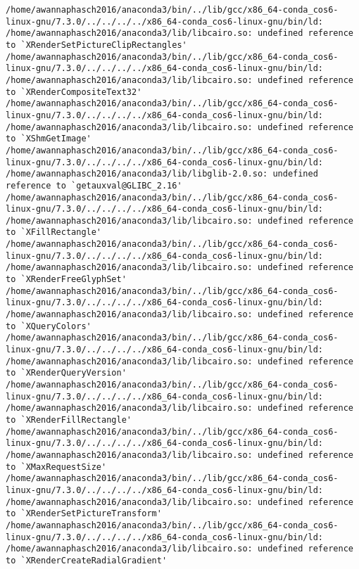 \documentclass[11pt]{article}
\begin{document}
\begin{enumerate}
\begin{enumerate}
\begin{verbatim}
/home/awannaphasch2016/anaconda3/bin/../lib/gcc/x86_64-conda_cos6-linux-gnu/7.3.0/../../../../x86_64-conda_cos6-linux-gnu/bin/ld: /home/awannaphasch2016/anaconda3/lib/libcairo.so: undefined reference to `XRenderSetPictureClipRectangles'
/home/awannaphasch2016/anaconda3/bin/../lib/gcc/x86_64-conda_cos6-linux-gnu/7.3.0/../../../../x86_64-conda_cos6-linux-gnu/bin/ld: /home/awannaphasch2016/anaconda3/lib/libcairo.so: undefined reference to `XRenderCompositeText32'
/home/awannaphasch2016/anaconda3/bin/../lib/gcc/x86_64-conda_cos6-linux-gnu/7.3.0/../../../../x86_64-conda_cos6-linux-gnu/bin/ld: /home/awannaphasch2016/anaconda3/lib/libcairo.so: undefined reference to `XShmGetImage'
/home/awannaphasch2016/anaconda3/bin/../lib/gcc/x86_64-conda_cos6-linux-gnu/7.3.0/../../../../x86_64-conda_cos6-linux-gnu/bin/ld: /home/awannaphasch2016/anaconda3/lib/libglib-2.0.so: undefined reference to `getauxval@GLIBC_2.16'
/home/awannaphasch2016/anaconda3/bin/../lib/gcc/x86_64-conda_cos6-linux-gnu/7.3.0/../../../../x86_64-conda_cos6-linux-gnu/bin/ld: /home/awannaphasch2016/anaconda3/lib/libcairo.so: undefined reference to `XFillRectangle'
/home/awannaphasch2016/anaconda3/bin/../lib/gcc/x86_64-conda_cos6-linux-gnu/7.3.0/../../../../x86_64-conda_cos6-linux-gnu/bin/ld: /home/awannaphasch2016/anaconda3/lib/libcairo.so: undefined reference to `XRenderFreeGlyphSet'
/home/awannaphasch2016/anaconda3/bin/../lib/gcc/x86_64-conda_cos6-linux-gnu/7.3.0/../../../../x86_64-conda_cos6-linux-gnu/bin/ld: /home/awannaphasch2016/anaconda3/lib/libcairo.so: undefined reference to `XQueryColors'
/home/awannaphasch2016/anaconda3/bin/../lib/gcc/x86_64-conda_cos6-linux-gnu/7.3.0/../../../../x86_64-conda_cos6-linux-gnu/bin/ld: /home/awannaphasch2016/anaconda3/lib/libcairo.so: undefined reference to `XRenderQueryVersion'
/home/awannaphasch2016/anaconda3/bin/../lib/gcc/x86_64-conda_cos6-linux-gnu/7.3.0/../../../../x86_64-conda_cos6-linux-gnu/bin/ld: /home/awannaphasch2016/anaconda3/lib/libcairo.so: undefined reference to `XRenderFillRectangle'
/home/awannaphasch2016/anaconda3/bin/../lib/gcc/x86_64-conda_cos6-linux-gnu/7.3.0/../../../../x86_64-conda_cos6-linux-gnu/bin/ld: /home/awannaphasch2016/anaconda3/lib/libcairo.so: undefined reference to `XMaxRequestSize'
/home/awannaphasch2016/anaconda3/bin/../lib/gcc/x86_64-conda_cos6-linux-gnu/7.3.0/../../../../x86_64-conda_cos6-linux-gnu/bin/ld: /home/awannaphasch2016/anaconda3/lib/libcairo.so: undefined reference to `XRenderSetPictureTransform'
/home/awannaphasch2016/anaconda3/bin/../lib/gcc/x86_64-conda_cos6-linux-gnu/7.3.0/../../../../x86_64-conda_cos6-linux-gnu/bin/ld: /home/awannaphasch2016/anaconda3/lib/libcairo.so: undefined reference to `XRenderCreateRadialGradient'

\end{verbatim}
\end{enumerate}
\end{enumerate}
\end{document}
